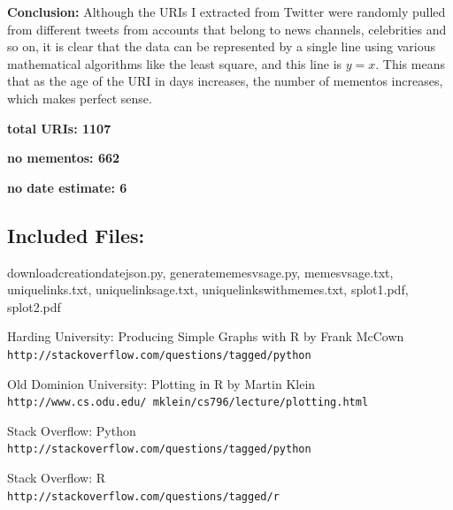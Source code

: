 \documentclass[a4paper, 11pt]{article}
\begin{document}
\textbf{Conclusion:}
Although the URIs I extracted from Twitter were randomly pulled from different tweets from accounts that belong to news channels, celebrities and so on, it is clear that the data can be represented by a single line using various mathematical algorithms like the least square, and this line is $y = x$. This means that as the age of the URI in days increases, the number of mementos increases, which makes perfect sense.
\linebreak

\textbf{total URIs: 1107}

\textbf{no mementos: 662}  

\textbf{no date estimate: 6}

\subsection*{Included Files:}
downloadcreationdatejson.py, generatememesvsage.py, memesvsage.txt, uniquelinks.txt, uniquelinksage.txt, uniquelinkswithmemes.txt, splot1.pdf, splot2.pdf

\pagebreak


\begin{thebibliography}{9}
Harding University: Producing Simple Graphs with R by Frank McCown
\\\texttt{http://stackoverflow.com/questions/tagged/python}

Old Dominion University: Plotting in R by Martin Klein
\\\texttt{http://www.cs.odu.edu/~mklein/cs796/lecture/plotting.html}
 
Stack Overflow: Python
\\\texttt{http://stackoverflow.com/questions/tagged/python}

Stack Overflow: R
\\\texttt{http://stackoverflow.com/questions/tagged/r}

\end{thebibliography}
\end{document}
